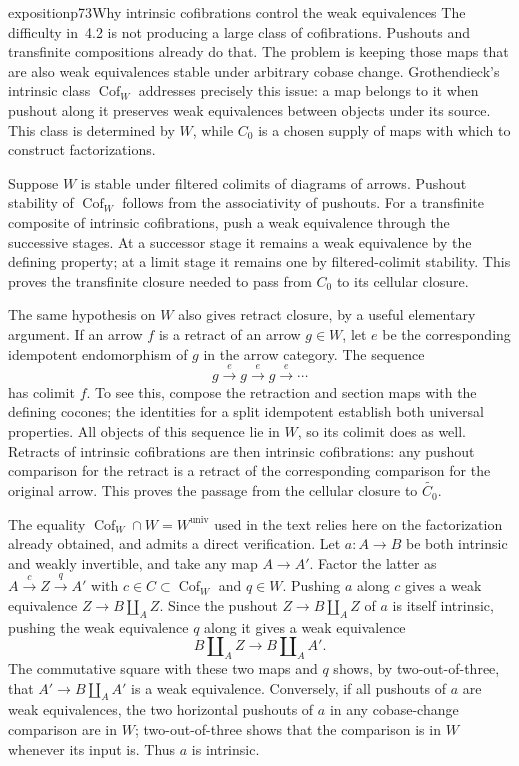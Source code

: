 \begin{dcomment}{exposition}{p73}{Why intrinsic cofibrations control the weak equivalences}
The difficulty in~4.2 is not producing a large class of cofibrations. Pushouts and transfinite compositions already do that. The problem is keeping those maps that are also weak equivalences stable under arbitrary cobase change. Grothendieck's intrinsic class $\operatorname{Cof}_W$ addresses precisely this issue: a map belongs to it when pushout along it preserves weak equivalences between objects under its source. This class is determined by $W$, while $C_0$ is a chosen supply of maps with which to construct factorizations.

Suppose $W$ is stable under filtered colimits of diagrams of arrows. Pushout stability of $\operatorname{Cof}_W$ follows from the associativity of pushouts. For a transfinite composite of intrinsic cofibrations, push a weak equivalence through the successive stages. At a successor stage it remains a weak equivalence by the defining property; at a limit stage it remains one by filtered-colimit stability. This proves the transfinite closure needed to pass from $C_0$ to its cellular closure.

The same hypothesis on $W$ also gives retract closure, by a useful elementary argument. If an arrow $f$ is a retract of an arrow $g\in W$, let $e$ be the corresponding idempotent endomorphism of $g$ in the arrow category. The sequence
\[
 g\xrightarrow{e}g\xrightarrow{e}g\xrightarrow{e}\cdots
\]
has colimit $f$. To see this, compose the retraction and section maps with the defining cocones; the identities for a split idempotent establish both universal properties. All objects of this sequence lie in $W$, so its colimit does as well. Retracts of intrinsic cofibrations are then intrinsic cofibrations: any pushout comparison for the retract is a retract of the corresponding comparison for the original arrow. This proves the passage from the cellular closure to $\widetilde{C_0}$.

The equality $\operatorname{Cof}_W\cap W=W^{\mathrm{univ}}$ used in the text relies here on the factorization already obtained, and admits a direct verification. Let $a:A\to B$ be both intrinsic and weakly invertible, and take any map $A\to A'$. Factor the latter as $A\xrightarrow c Z\xrightarrow q A'$ with $c\in C\subset\operatorname{Cof}_W$ and $q\in W$. Pushing $a$ along $c$ gives a weak equivalence $Z\to B\amalg_A Z$. Since the pushout $Z\to B\amalg_A Z$ of $a$ is itself intrinsic, pushing the weak equivalence $q$ along it gives a weak equivalence
\[
 B\amalg_A Z\longrightarrow B\amalg_A A'.
\]
The commutative square with these two maps and $q$ shows, by two-out-of-three, that $A'\to B\amalg_A A'$ is a weak equivalence. Conversely, if all pushouts of $a$ are weak equivalences, the two horizontal pushouts of $a$ in any cobase-change comparison are in $W$; two-out-of-three shows that the comparison is in $W$ whenever its input is. Thus $a$ is intrinsic.


\end{dcomment}
